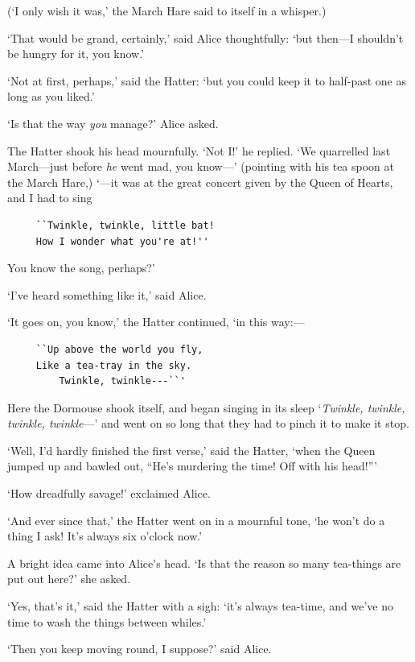 \documentclass[12pt,openany]{memoir}
\begin{document}
(`I only wish it was,' the March Hare said to itself in a whisper.)

`That would be grand, certainly,' said Alice thoughtfully: `but then---I shouldn't be hungry for it, you know.'

`Not at first, perhaps,' said the Hatter: `but you could keep it to half-past one as long as you liked.'

`Is that the way \textit{you} manage?' Alice asked.

The Hatter shook his head mournfully. `Not I!' he replied. `We quarrelled last March---just before \textit{he} went mad, you know---' (pointing with his tea spoon at the March Hare,) `---it was at the great concert given by the Queen of Hearts, and I had to sing

\begin{verbatim}
     ``Twinkle, twinkle, little bat!
     How I wonder what you're at!''
\end{verbatim}

You know the song, perhaps?'

`I've heard something like it,' said Alice.

`It goes on, you know,' the Hatter continued, `in this way:---

\begin{verbatim}
     ``Up above the world you fly,
     Like a tea-tray in the sky.
         Twinkle, twinkle---``'
\end{verbatim}

Here the Dormouse shook itself, and began singing in its sleep `\textit{Twinkle, twinkle, twinkle, twinkle}---' and went on so long that they had to pinch it to make it stop.

`Well, I'd hardly finished the first verse,' said the Hatter, `when the Queen jumped up and bawled out, ``He's murdering the time! Off with his head!'''

`How dreadfully savage!' exclaimed Alice.

`And ever since that,' the Hatter went on in a mournful tone, `he won't do a thing I ask! It's always six o'clock now.'

A bright idea came into Alice's head. `Is that the reason so many tea-things are put out here?' she asked.

`Yes, that's it,' said the Hatter with a sigh: `it's always tea-time, and we've no time to wash the things between whiles.'

`Then you keep moving round, I suppose?' said Alice.
\end{document}
